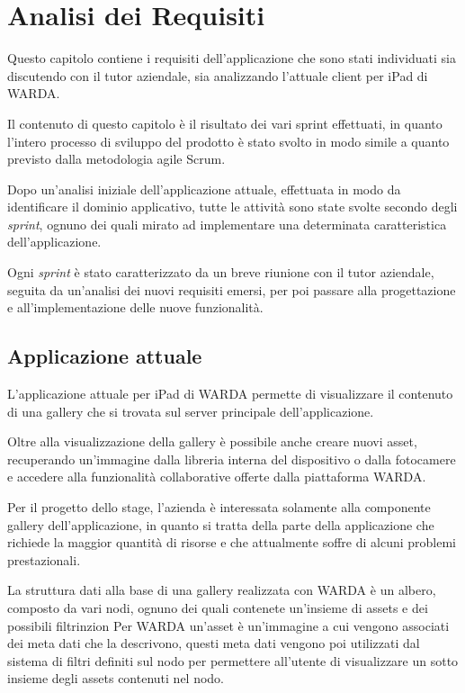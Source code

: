 
\chapter{Analisi dei Requisiti}
\label{cap:analisi-dei-requisiti}

Questo capitolo contiene i requisiti dell'applicazione che sono stati individuati sia discutendo con il tutor aziendale, sia analizzando l'attuale client per iPad di WARDA.

Il contenuto di questo capitolo è il risultato dei vari sprint effettuati, in quanto l'intero processo di sviluppo del prodotto è stato svolto in modo simile a quanto previsto dalla metodologia agile Scrum.

Dopo un'analisi iniziale dell'applicazione attuale, effettuata in modo da identificare il dominio applicativo, tutte le attività sono state svolte secondo degli \textit{sprint}, ognuno dei quali mirato ad implementare una determinata caratteristica dell'applicazione.

Ogni \textit{sprint} è stato caratterizzato da un breve riunione con il tutor aziendale, seguita da un'analisi dei nuovi requisiti emersi, per poi passare alla progettazione e all'implementazione delle nuove funzionalità.


\section{Applicazione attuale}

L'applicazione attuale per iPad di WARDA permette di visualizzare il contenuto di una gallery che si trovata sul server principale dell'applicazione.

Oltre alla visualizzazione della gallery è possibile anche creare nuovi asset, recuperando un'immagine dalla libreria interna del dispositivo o dalla fotocamere e accedere alla funzionalità collaborative offerte dalla piattaforma WARDA.

Per il progetto dello stage, l'azienda è interessata solamente alla componente gallery dell'applicazione, in quanto si tratta della parte della applicazione che richiede la maggior quantità di risorse e che attualmente soffre di alcuni problemi prestazionali.

La struttura dati alla base di una gallery realizzata con WARDA è un albero, composto da vari nodi, ognuno dei quali contenete un'insieme di assets e dei possibili filtrinzion
Per WARDA un'asset è un'immagine a cui vengono associati dei meta dati che la descrivono, questi meta dati vengono poi utilizzati dal sistema di filtri definiti sul nodo per permettere all'utente di visualizzare un sotto insieme degli assets contenuti nel nodo.


